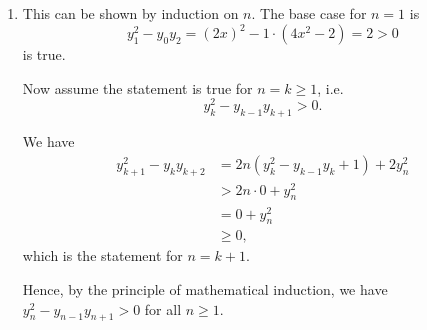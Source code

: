\begin{enumerate}
    \item This can be shown by induction on \(n\). The base case for \(n = 1\) is
          \[
              y_1^2 - y_0 y_2 = (2x)^2 - 1 \cdot (4x^2 - 2) = 2 > 0
          \]
          is true.

          Now assume the statement is true for \(n = k \geq 1\), i.e.
          \[
              y_k^2 - y_{k - 1} y_{k + 1} > 0.
          \]

          We have
          \begin{align*}
              y_{k + 1}^2 - y_k y_{k + 2} & = 2n (y_k^2 - y_{k - 1} y_k + 1) + 2 y_n^2 \\
                                          & > 2n \cdot 0 + y_n^2                       \\
                                          & = 0 + y_n^2                                \\
                                          & \geq 0,
          \end{align*}
          which is the statement for \(n = k + 1\).

          Hence, by the principle of mathematical induction, we have \(y_n^2 - y_{n - 1} y_{n + 1} > 0\) for all \(n \geq 1\).
\end{enumerate}
